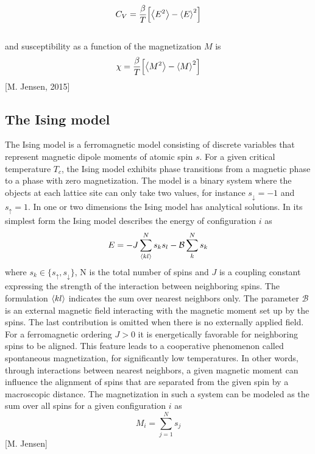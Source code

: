 \documentclass[%
reprint,nofootinbib,
amsmath,amssymb,
aps,
]{revtex4-1}
\begin{document}
\begin{equation}\label{cv}
C_V = \dfrac{\beta}{T}\qty[\expval{E^2}-\expval{E}^2]
\end{equation}\vspace{1mm} \\ 
and susceptibility as a function of the magnetization $M$ is \vspace{1mm} \\ 
\begin{equation}\label{chi}
\chi = \dfrac{\beta}{T}\qty[\expval{M^2}- \expval{M}^2] \vspace{4mm}
\end{equation} 
\hspace{6cm}[M. Jensen, 2015]

\subsection*{The Ising model} \noindent 
The Ising model is a ferromagnetic model consisting of discrete variables that represent magnetic dipole moments of atomic spin $s$. For a given critical temperature $T_c$, the Ising model exhibits phase transitions from a magnetic phase to a phase with zero magnetization. The model is a binary system where the objects at each lattice site can only take two values, for instance $s_\downarrow = -1$ and $s_\uparrow = 1$. In one or two dimensions the Ising model has analytical solutions. In its simplest form the Ising model describes the energy of configuration $i$ as  
\begin{equation}\label{isemodel}
	E = -J\sum_{\expval{kl}}^{N}s_ks_l -\mathcal{B} \sum_{k}^{N} s_k
\end{equation}
where $s_k \in \{s_\uparrow, s_\downarrow\}$, N is the total number of spins and $J$ is a coupling constant expressing the strength of the interaction between neighboring spins. The formulation $\expval{kl}$ indicates the sum over nearest neighbors only. The parameter $\mathcal{B}$ is an external magnetic field interacting with the magnetic moment set up by the spins. The last contribution is omitted when there is no externally applied field.\\ \indent 
For a ferromagnetic ordering $J> 0$ it is energetically favorable for neighboring spins to be aligned. This feature leads to a cooperative phenomenon called spontaneous magnetization, for significantly low temperatures. In other words, through interactions between nearest neighbors, a given magnetic moment can influence the alignment of spins that are separated from the given spin by a macroscopic distance. The magnetization in such a system can be modeled as the sum over all spins for a given configuration $i$ as \\ 
\begin{equation}\label{mf}
M_i = \sum_{j = 1}^{N}s_j
\end{equation}
\hspace{6.9cm}[M. Jensen]
\end{document}
